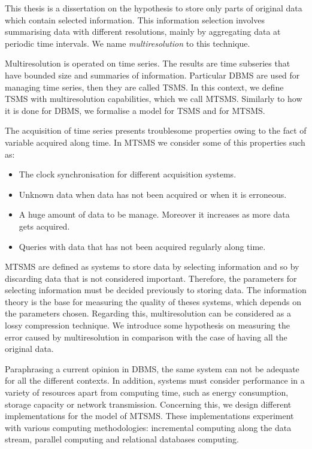 This thesis is a dissertation on the hypothesis to store only parts of
original data which contain selected information.  This information
selection involves summarising data with different resolutions, mainly
by aggregating data at periodic time intervals.
We name \emph{multiresolution} to this technique.


Multiresolution is operated on time series. The results are time
subseries that have bounded size and summaries of information.
Particular \gls{DBMS} are used for managing time series, then they are
called \gls{TSMS}. In this context, we define \gls{TSMS} with
multiresolution capabilities, which we call \gls{MTSMS}.  Similarly
to how it is done for \gls{DBMS}, we formalise a model for
\gls{TSMS} and for \gls{MTSMS}.



The acquisition of time series presents troublesome properties owing
to the fact of variable acquired along time.
In \gls{MTSMS} we consider some of this properties such as:
\begin{itemize}
\item The clock synchronisation for different acquisition systems. 
\item Unknown data when data has not been acquired or when it is
  erroneous.
\item A huge amount of data to be manage. Moreover it increases as
  more data gets acquired.
\item Queries with data that has not been acquired regularly along
  time.
\end{itemize}


\gls{MTSMS} are defined as systems to store data by selecting
information and so by discarding data that is not considered
important. Therefore, the parameters for selecting information must be
decided previously to storing data. The information theory is the base
for measuring the quality of theses systems, which depends on the
parameters chosen. Regarding this, multiresolution can be considered
as a lossy compression technique. We introduce some hypothesis on
measuring the error caused by multiresolution in comparison with the
case of having all the original data.


Paraphrasing a current opinion in \gls{DBMS}, the same system can not
be adequate for all the different contexts. In addition, systems must
consider performance in a variety of resources apart from computing
time, such as energy consumption, storage capacity or network
transmission. Concerning this, we design different implementations for
the model of \gls{MTSMS}. These implementations experiment with
various computing methodologies: incremental computing along the data
stream, parallel computing and relational databases computing.


